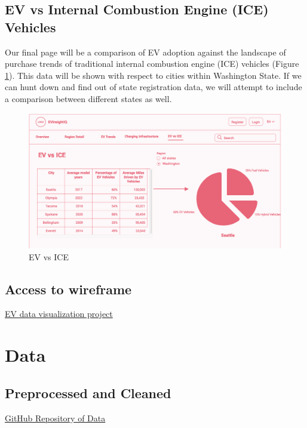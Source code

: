 \documentclass{article}
\begin{document}
\subsection{EV vs Internal Combustion Engine (ICE) Vehicles}
Our final page will be a comparison of EV adoption against the landscape of
purchase trends of traditional internal combustion engine (ICE) vehicles (Figure
\ref{fig:evfuel}).  This data will be shown with respect to cities within
Washington State.  If we can hunt down and find out of state registration data,
we will attempt to include a comparison between different states as well.
\begin{figure}[!ht]
    \centering
    \includegraphics[scale=0.24]{EV vs Fuel}
    \caption{EV vs ICE}
    \label{fig:evfuel}
\end{figure}

\subsection{Access to wireframe}
\href{https://claritee.io/view/12733/14589/92384/1bf7a5d4-b9c8-42aa-a914-98842533efbf}{EV data visualization project}\\

\section{Data}
\subsection{Preprocessed and Cleaned}
\href{https://github.com/mk-imagine/csc805g5/tree/main/data}{GitHub Repository of Data}
\end{document}
